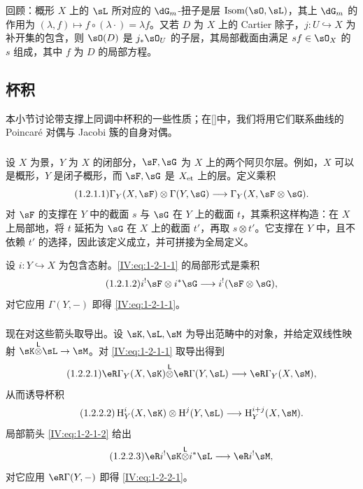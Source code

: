 \subsubsection{}\label{IV:1-1-6}
回顾：概形 $X$ 上的 $\sL$ 所对应的 $\dG_m$-扭子是层 $\operatorname{Isom}(\sO,\sL)$，其上 $\dG_m$ 的作用为 $(\lambda,f)\mapsto f\circ(\lambda\cdot)=\lambda f$。又若 $D$ 为 $X$ 上的 Cartier 除子，$j:U\hookrightarrow X$ 为补开集的包含，则 $\sO(D)$ 是 $j_*\sO_U$ 的子层，其局部截面由满足 $sf\in\sO_X$ 的 $s$ 组成，其中 $f$ 为 $D$ 的局部方程。

\subsection{杯积}\label{IV:1-2}
本小节讨论带支撑上同调中杯积的一些性质；在[]中，我们将用它们联系曲线的 Poincaré 对偶与 Jacobi 簇的自身对偶。

\subsubsection{}\label{IV:1-2-1}
设 $X$ 为景，$Y$ 为 $X$ 的闭部分，$\sF,\sG$ 为 $X$ 上的两个阿贝尔层。例如，$X$ 可以是概形，$Y$ 是闭子概形，而 $\sF,\sG$ 是 ${X}_{\textnormal{et}}$ 上的层。定义乘积
\begin{equation*}\tag{1.2.1.1}\label{IV:eq:1-2-1-1}
\Gamma_Y(X,\sF)\otimes\Gamma(Y,\sG)\longrightarrow\Gamma_Y(X,\sF\otimes\sG).
\end{equation*}
对 $\sF$ 的支撑在 $Y$ 中的截面 $s$ 与 $\sG$ 在 $Y$ 上的截面 $t$，其乘积这样构造：在 $X$ 上局部地，将 $t$ 延拓为 $\sG$ 在 $X$ 上的截面 $t'$，再取 $s\otimes t'$。它支撑在 $Y$ 中，且不依赖 $t'$ 的选择，因此该定义成立，并可拼接为全局定义。

设 $i:Y\hookrightarrow X$ 为包含态射。\eqref{IV:eq:1-2-1-1} 的局部形式是乘积
\begin{equation*}\tag{1.2.1.2}\label{IV:eq:1-2-1-2}
i^!\sF\otimes i^*\sG\longrightarrow i^!(\sF\otimes\sG),
\end{equation*}
对它应用 $\Gamma(Y,-)$ 即得 \eqref{IV:eq:1-2-1-1}。

\subsubsection{}\label{IV:1-2-2}
现在对这些箭头取导出。设 $\sK,\sL,\sM$ 为导出范畴中的对象，并给定双线性映射 $\sK\lotimes\sL\to\sM$。对 \eqref{IV:eq:1-2-1-1} 取导出得到
\begin{equation*}\tag{1.2.2.1}\label{IV:eq:1-2-2-1}
\eR\Gamma_Y(X,\sK)\lotimes\eR\Gamma(Y,\sL)\longrightarrow\eR\Gamma_Y(X,\sM),
\end{equation*}
从而诱导杯积
\begin{equation*}\tag{1.2.2.2}\label{IV:eq:1-2-2-2}
\h_Y^i(X,\sK)\otimes\h^j(Y,\sL)\longrightarrow\h_Y^{i+j}(X,\sM).
\end{equation*}
局部箭头 \eqref{IV:eq:1-2-1-2} 给出
\begin{equation*}\tag{1.2.2.3}\label{IV:eq:1-2-2-3}
\eR i^!\sK\lotimes i^*\sL\longrightarrow\eR i^!\sM,
\end{equation*}
对它应用 $\eR\Gamma(Y,-)$ 即得 \eqref{IV:eq:1-2-2-1}。


